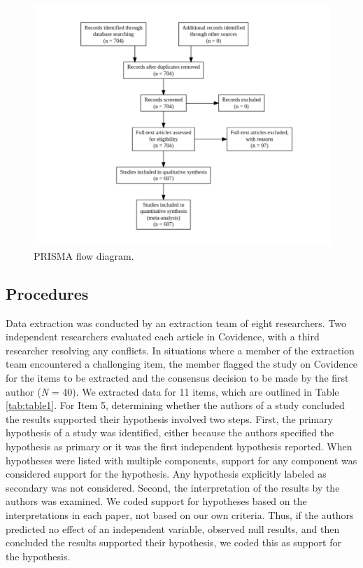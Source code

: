 \documentclass[
  doc, donotrepeattitle,floatsintext]{apa7}
\begin{document}
\pagebreak

\begin{figure}

{\centering \includegraphics{../../figs/fig1} 

}

\caption{PRISMA flow diagram.}\label{fig:fig1}
\end{figure}



\pagebreak

\hypertarget{procedures}{%
\subsection{Procedures}\label{procedures}}

Data extraction was conducted by an extraction team of eight researchers. Two independent researchers evaluated each article in Covidence, with a third researcher resolving any conflicts. In situations where a member of the extraction team encountered a challenging item, the member flagged the study on Covidence for the items to be extracted and the consensus decision to be made by the first author (\emph{N} = 40). We extracted data for 11 items, which are outlined in Table \ref{tab:table1}. For Item 5, determining whether the authors of a study concluded the results supported their hypothesis involved two steps. First, the primary hypothesis of a study was identified, either because the authors specified the hypothesis as primary or it was the first independent hypothesis reported. When hypotheses were listed with multiple components, support for any component was considered support for the hypothesis. Any hypothesis explicitly labeled as secondary was not considered. Second, the interpretation of the results by the authors was examined. We coded support for hypotheses based on the interpretations in each paper, not based on our own criteria. Thus, if the authors predicted no effect of an independent variable, observed null results, and then concluded the results supported their hypothesis, we coded this as support for the hypothesis.
\end{document}
